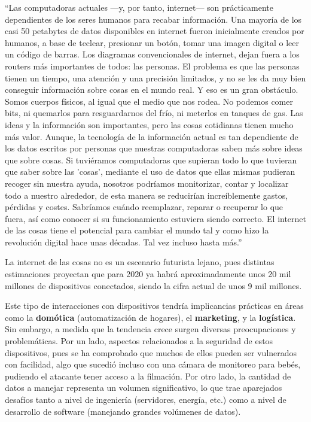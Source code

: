 ``Las computadoras actuales —y, por tanto, internet— son prácticamente
dependientes de los seres humanos para recabar información. Una mayoría de los
casi 50 petabytes de datos disponibles en internet fueron inicialmente creados
por humanos, a base de teclear, presionar un botón, tomar una imagen digital o
leer un código de barras. Los diagramas convencionales de internet, dejan fuera
a los routers más importantes de todos: las personas. El problema es que las
personas tienen un tiempo, una atención y una precisión limitados, y no se les
da muy bien conseguir información sobre cosas en el mundo real. Y eso es un gran
obstáculo. Somos cuerpos físicos, al igual que el medio que nos rodea. No
podemos comer bits, ni quemarlos para resguardarnos del frío, ni meterlos en
tanques de gas. Las ideas y la información son importantes, pero las cosas
cotidianas tienen mucho más valor. Aunque, la tecnología de la información
actual es tan dependiente de los datos escritos por personas que nuestras
computadoras saben más sobre ideas que sobre cosas. Si tuviéramos computadoras
que supieran todo lo que tuvieran que saber sobre las 'cosas', mediante el uso
de datos que ellas mismas pudieran recoger sin nuestra ayuda, nosotros podríamos
monitorizar, contar y localizar todo a nuestro alrededor, de esta manera se
reducirían increíblemente gastos, pérdidas y costes. Sabríamos cuándo
reemplazar, reparar o recuperar lo que fuera, así como conocer si su
funcionamiento estuviera siendo correcto. El internet de las cosas tiene el
potencial para cambiar el mundo tal y como hizo la revolución digital hace unas
décadas. Tal vez incluso hasta más.''
\textcite{ashton_2009}

La internet de las cosas no es un escenario futurista lejano, pues distintas
estimaciones proyectan que para 2020 ya habrá aproximadamente unos 20 mil
millones de dispositivos conectados, siendo la cifra actual de unos 9 mil
millones.
\autocite{gartner_2017}

Este tipo de interacciones con dispositivos tendría implicancias prácticas en
áreas como la \textbf{domótica} (automatización de hogares), el
\textbf{marketing}, y la \textbf{logística}. Sin embargo, a medida que la
tendencia crece surgen diversas preocupaciones y problemáticas. Por un lado,
aspectos relacionados a la seguridad de estos dispositivos, pues se ha
comprobado que muchos de ellos pueden ser vulnerados con facilidad, algo que
sucedió incluso con una cámara de monitoreo para bebés, pudiendo el atacante
tener acceso a la filmación. Por otro lado, la cantidad de datos a manejar
representa un volumen significativo, lo que trae aparejados desafíos tanto a
nivel de ingeniería (servidores, energía, etc.) como a nivel de desarrollo de
software (manejando grandes volúmenes de datos).

